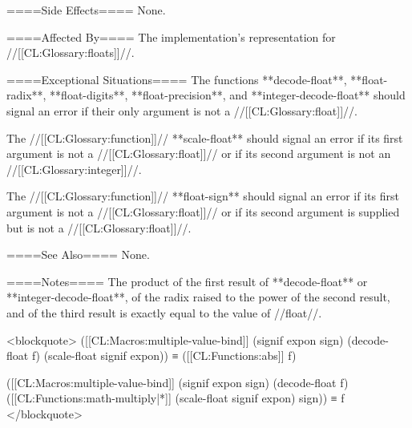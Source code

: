 ====Side Effects====
None.

====Affected By====
The implementation's representation for //[[CL:Glossary:floats]]//.

====Exceptional Situations====
The functions **decode-float**, **float-radix**, **float-digits**, **float-precision**, and **integer-decode-float** should signal an error if their only argument is not a //[[CL:Glossary:float]]//.

The //[[CL:Glossary:function]]// **scale-float** should signal an error if its first argument is not a //[[CL:Glossary:float]]// or if its second argument is not an //[[CL:Glossary:integer]]//.

The //[[CL:Glossary:function]]// **float-sign** should signal an error if its first argument is not a //[[CL:Glossary:float]]// or if its second argument is supplied but is not a //[[CL:Glossary:float]]//.

====See Also====
None.

====Notes====
The product of the first result of **decode-float** or **integer-decode-float**, of the radix raised to the power of the second result, and of the third result is exactly equal to the value of //float//.

<blockquote>
([[CL:Macros:multiple-value-bind]] (signif expon sign) 
    (decode-float f) 
  (scale-float signif expon)) 
  ≡ ([[CL:Functions:abs]] f)

([[CL:Macros:multiple-value-bind]] (signif expon sign) 
    (decode-float f) 
  ([[CL:Functions:math-multiply|*]] (scale-float signif expon) sign)) 
  ≡ f
</blockquote>

